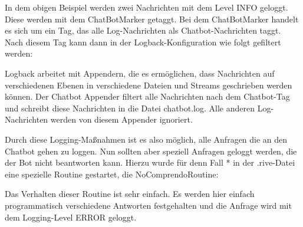 In dem obigen Beispiel werden zwei Nachrichten mit dem Level INFO geloggt. Diese werden mit dem ChatBotMarker getaggt. Bei dem ChatBotMarker handelt es sich um ein Tag, das alle Log-Nachrichten als Chatbot-Nachrichten taggt. Nach diesem Tag kann dann in der Logback-Konfiguration wie folgt gefiltert werden:


Logback arbeitet mit Appendern, die es ermöglichen, dass Nachrichten auf verschiedenen Ebenen in verschiedene Dateien und Streams geschrieben werden können. Der Chatbot Appender filtert alle Nachrichten nach dem Chatbot-Tag und schreibt diese Nachrichten in die Datei chatbot.log. Alle anderen Log-Nachrichten werden von diesem Appender ignoriert.

Durch diese Logging-Maßnahmen ist es also möglich, alle Anfragen die an den Chatbot gehen zu loggen. Nun sollten aber speziell Anfragen geloggt werden, die der Bot nicht beantworten kann. Hierzu wurde für denn Fall * in der .rive-Datei eine spezielle Routine gestartet, die NoComprendoRoutine:


Das Verhalten dieser Routine ist sehr einfach. Es werden hier einfach programmatisch verschiedene Antworten festgehalten und die Anfrage wird mit dem Logging-Level ERROR geloggt.
